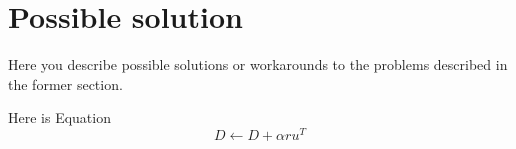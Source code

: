 \section{Possible solution}

Here you describe possible solutions or workarounds to the problems described in the former section.

Here is Equation~
\begin{equation}
D \leftarrow D + \alpha ru^T
\label{eq:solution}
\end{equation}